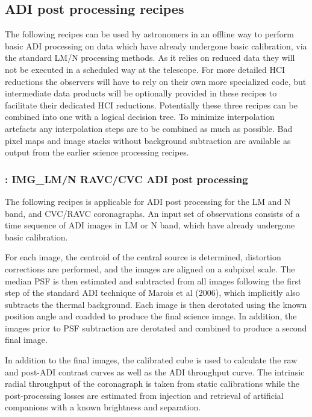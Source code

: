 
\subsection{ADI post processing recipes}
\label{ssec:ADI_postprocessing}



The following recipes can be used by astronomers in an offline way to
perform basic ADI processing on data which have already undergone
basic calibration, via the standard LM/N processing methods.  As it
relies on reduced data they will not be executed in a scheduled way at
the telescope. For more detailed HCI reductions the observers will
have to rely on their own more specialized code, but intermediate data
products will be optionally provided in these recipes to facilitate
their dedicated HCI reductions. Potentially these three recipes can be combined into one with a logical decision tree. To minimize interpolation artefacts any interpolation steps are to be combined as much as possible. Bad pixel maps and image stacks without background subtraction are available as output from the earlier science processing recipes.

\subsubsection{: IMG\_LM/N RAVC/CVC ADI post processing}
\label{sssec:adi_img_vc}


The following recipes is applicable for ADI post processing for the LM
and N band, and CVC/RAVC coronagraphs. An input set of
observations consists of a time sequence of ADI images in LM or N
band, which have already undergone basic calibration. 

For each image, the centroid of the central source is determined,
distortion corrections are performed, and the images are aligned on a
subpixel scale. The median PSF is then estimated and subtracted from
all images following the first step of the standard ADI technique of
Marois et al (2006), which implicitly also subtracts the thermal background.
Each image is then derotated using the known
position angle and coadded to produce the final science image. In
addition, the images prior to PSF subtraction are derotated and
combined to produce a second final image.

In addition to the final images, the calibrated cube is used to calculate the raw and post-ADI contrast curves as
well as the ADI throughput curve. The intrinsic radial throughput of
the coronagraph is taken from static calibrations while the
post-processing losses are estimated from injection and retrieval of
artificial companions with a known brightness and separation.

